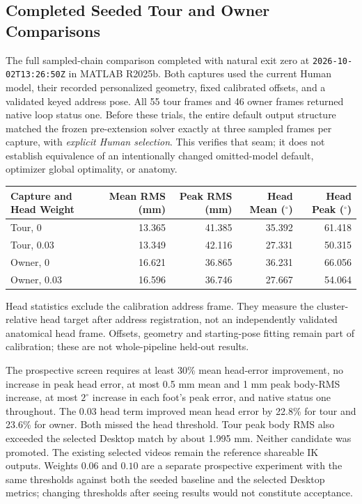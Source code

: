 \documentclass[11pt,a4paper]{article}
\begin{document}
\subsection{Completed Seeded Tour and Owner Comparisons}
The full sampled-chain comparison completed with natural exit zero at
\texttt{2026-10-02T13:26:50Z} in MATLAB R2025b. Both captures used the
current Human model, their recorded personalized geometry, fixed calibrated
offsets, and a validated keyed address pose. All 55 tour frames and 46 owner
frames returned native loop status one. Before these trials, the entire
default output structure matched the frozen pre-extension solver exactly at
three sampled frames per capture, with \emph{explicit Human selection}.
This verifies that seam; it does not establish equivalence of an intentionally
changed omitted-model default, optimizer global optimality, or anatomy.

\begin{center}
\begin{tabular}{lrrrr}
\toprule
Capture and Head Weight & Mean RMS (mm) & Peak RMS (mm) & Head Mean ($^\circ$) & Head Peak ($^\circ$) \\
\midrule
Tour, $0$ & 13.365 & 41.385 & 35.392 & 61.418 \\
Tour, $0.03$ & 13.349 & 42.116 & 27.331 & 50.315 \\
Owner, $0$ & 16.621 & 36.865 & 36.231 & 66.056 \\
Owner, $0.03$ & 16.596 & 36.746 & 27.667 & 54.064 \\
\bottomrule
\end{tabular}
\end{center}
Head statistics exclude the calibration address frame. They measure the
cluster-relative head target after address registration, not an independently
validated anatomical head frame. Offsets, geometry and starting-pose fitting
remain part of calibration; these are not whole-pipeline held-out results.

The prospective screen requires at least 30\% mean head-error improvement,
no increase in peak head error, at most 0.5 mm mean and 1 mm peak body-RMS
increase, at most $2^\circ$ increase in each foot's peak error, and native
status one throughout. The $0.03$ head term improved mean head error by
22.8\% for tour and 23.6\% for owner. Both missed the head threshold.
Tour peak body RMS also exceeded the selected Desktop match by about
1.995 mm. Neither candidate was promoted. The existing selected videos
remain the reference shareable IK outputs. Weights $0.06$ and $0.10$ are a
separate prospective experiment with the same thresholds against both the
seeded baseline and the selected Desktop metrics; changing thresholds after
seeing results would not constitute acceptance.
\end{document}
